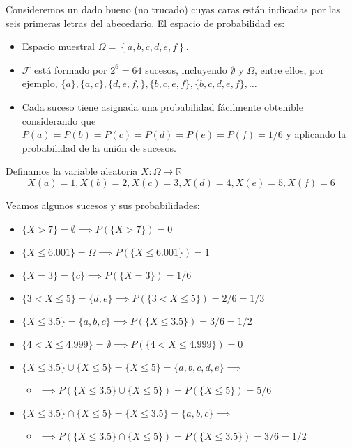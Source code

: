 \documentclass[11pt]{article}
\providecommand{\tightlist}{%
      \setlength{\itemsep}{0pt}\setlength{\parskip}{0pt}}
\begin{document}
Consideremos un dado bueno (no trucado) cuyas caras están indicadas por
las seis primeras letras del abecedario. El espacio de probabilidad es:

\begin{itemize}
\tightlist
\item
  Espacio muestral \(\Omega=\left\{a, b, c, d, e, f\right\}\).
\item
  \(\mathscr{F}\) está formado por \(2^6 = 64\) sucesos, incluyendo
  \(\emptyset\) y \(\Omega\), entre ellos, por ejemplo,
  \(\{a\}, \{a, c\}, \{d,e,f,\}, \{b,c,e,f\}, \{b,c,d,e,f\},\ldots\)
\item
  Cada suceso tiene asignada una probabilidad fácilmente obtenible
  considerando que \(P(a)=P(b)=P(c)=P(d)=P(e)=P(f)=1/6\) y aplicando la
  probabilidad de la unión de sucesos.
\end{itemize}

    Definamos la variable aleatoria \(X: \Omega \longmapsto \mathbb{R}\)
\[X(a)=1, X(b)=2, X(c)=3, X(d)=4, X(e)=5, X(f)=6\]

Veamos algunos sucesos y sus probabilidades:

\begin{itemize}
\tightlist
\item
  \(\{X > 7\} = \emptyset \implies P(\{X > 7\})=0\)
\item
  \(\{X \leq 6.001\} = \Omega \implies P(\{X \leq 6.001\})=1\)
\item
  \(\{X=3\} = \{c\} \implies P(\{X=3\})=1/6\)
\item
  \(\{3< X \leq 5\} = \{d, e\} \implies P(\{3< X \leq 5\})=2/6=1/3\)
\item
  \(\{X \leq 3.5\} = \{a, b, c\} \implies P(\{X \leq 3.5\})=3/6=1/2\)
\item
  \(\{4 < X \leq 4.999\} = \emptyset \implies P(\{4 < X \leq 4.999\})=0\)
\item
  \(\{X \leq 3.5\}\cup \{X \leq 5\} = \{X \leq 5\} = \{a, b, c, d ,e\} \implies\)

  \begin{itemize}
  \tightlist
  \item
    \(\implies P\left(\{X \leq 3.5\}\cup \{X \leq 5\}\right)=P\left(\{X \leq 5\}\right)=5/6\)
  \end{itemize}
\item
  \(\{X \leq 3.5\}\cap \{X \leq 5\} = \{X \leq 3.5\} = \{a, b, c\} \implies\)

  \begin{itemize}
  \tightlist
  \item
    \(\implies P\left(\{X \leq 3.5\}\cap \{X \leq 5\}\right)=P\left(\{X \leq 3.5\}\right)=3/6= 1/2\)
  \end{itemize}
\end{itemize}
\end{document}
